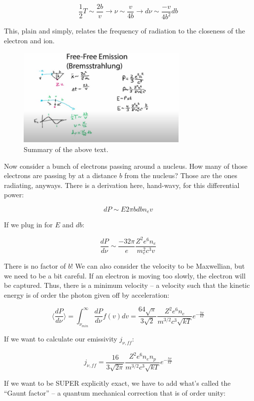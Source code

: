 \documentclass{article}
\begin{document}
$$
\frac12 T \sim \frac{2b}{v} \rightarrow \nu \sim \frac{v}{4b} \rightarrow d\nu \sim \frac{-v}{4b^2} db
$$

This, plain and simply, relates the frequency of radiation to the closeness of the electron and ion. 

\begin{figure}
    \centering
    \includegraphics[width=0.74\textwidth]{Screen Shot 2020-10-11 at 11.54.09 PM.png}
    \caption{Summary of the above text.}
    \label{fig:summmm2m2m}
\end{figure}

Now consider a bunch of electrons passing around a nucleus. How many of those electrons are passing by at a distance $b$ from the nucleus? Those are the ones radiating, anyways. There is a derivation here, hand-wavy, for this differential power:

$$
dP \sim E 2\pi b db n_e v
$$

If we plug in for $E$ and $db$:

$$
\frac{dP }{d\nu} \sim \frac{-32\pi}{e} \frac{Z^2 e^6 n_e}{m_e^2 c^3 v}
$$

There is no factor of $b$! We can also consider the velocity to be Maxwellian, but we need to be a bit careful. If an electron is moving too slowly, the electron will be captured. Thus, there is a minimum velocity -- a velocity such that the kinetic energy is of order the photon given off by acceleration:

$$
\boxed{\langle\frac{dP}{d\nu}\rangle = \int_{\nu_{min}}^{\infty} \frac{dP}{d\nu} f(v) dv = \frac{64 \sqrt{\pi}}{3\sqrt{2}} \frac{Z^2 e^6 n_e}{m^{3/2} c^3 \sqrt{kT}} e^{-\frac{h\nu}{kT}}}
$$

If we want to calculate our emissivity $j_{\nu,ff}$:

$$
\boxed{j_{\nu,ff} = \frac{16}{3\sqrt{2\pi}} \frac{Z^2 e^6 n_e n_p}{m^{3/2} c^3 \sqrt{kT}} e^{-\frac{h\nu}{kT}}}
$$

If we want to be SUPER explicitly exact, we have to add what's called the ``Gaunt factor'' -- a quantum mechanical correction that is of order unity:
\end{document}
